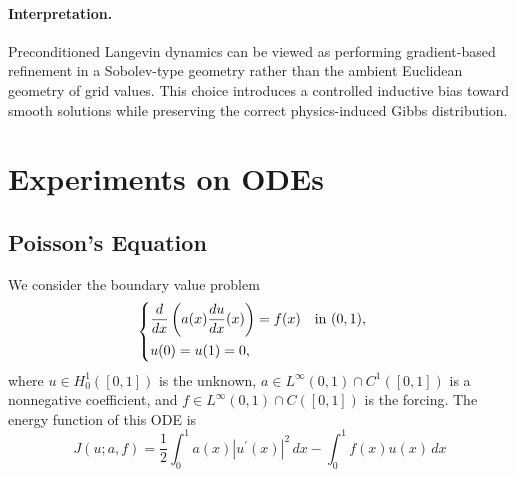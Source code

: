 \documentclass[11pt]{article}
\begin{document}
\paragraph{Interpretation.}
Preconditioned Langevin dynamics can be viewed as performing gradient-based refinement in a Sobolev-type geometry rather than the ambient Euclidean geometry of grid values. This choice introduces a controlled inductive bias toward smooth solutions while preserving the correct physics-induced Gibbs distribution.


\section{Experiments on ODEs}
\subsection{Poisson's Equation}
We consider the boundary value problem
\begin{equation*}
\begin{cases}
    \displaystyle\frac{d}{dx}\left(a(x)\frac{du}{dx}(x)\right)=f(x)\quad\text{in}\ (0,1),\vspace{0.1cm}\\
    u(0)=u(1)=0,
\end{cases}
\end{equation*}
where $u\in H_0^1([0,1])$ is the unknown, $a\in L^\infty(0,1)\cap C^1([0,1])$ is a nonnegative coefficient, and $f\in L^\infty(0,1)\cap C([0,1])$ is the forcing. The energy function of this ODE is
\begin{equation*}
J(u;a,f)=\frac{1}{2}\int_0^1 a(x)\left\vert u^\prime(x)\right\vert^2\,dx-\int_0^1 f(x)u(x)\,dx
\end{equation*}
\end{document}
